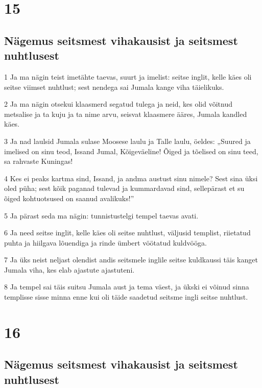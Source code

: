 \chapter{15}

\section*{Nägemus seitsmest vihakausist ja seitsmest nuhtlusest}

\par 1 Ja ma nägin teist imetähte taevas, suurt ja imelist: seitse inglit, kelle käes oli seitse viimset nuhtlust; sest nendega sai Jumala kange viha täielikuks.
\par 2 Ja ma nägin otsekui klaasmerd segatud tulega ja neid, kes olid võitnud metsalise ja ta kuju ja ta nime arvu, seisvat klaasmere ääres, Jumala kandled käes.
\par 3 Ja nad laulsid Jumala sulase Moosese laulu ja Talle laulu, öeldes: „Suured ja imelised on sinu teod, Issand Jumal, Kõigeväeline! Õiged ja tõelised on sinu teed, sa rahvaste Kuningas!
\par 4 Kes ei peaks kartma sind, Issand, ja andma austust sinu nimele? Sest sina üksi oled püha; sest kõik paganad tulevad ja kummardavad sind, sellepärast et su õiged kohtuotsused on saanud avalikuks!”
\par 5 Ja pärast seda ma nägin: tunnistustelgi tempel taevas avati.
\par 6 Ja need seitse inglit, kelle käes oli seitse nuhtlust, väljusid templist, riietatud puhta ja hiilgava lõuendiga ja rinde ümbert vöötatud kuldvööga.
\par 7 Ja üks neist neljast olendist andis seitsmele inglile seitse kuldkaussi täis kanget Jumala viha, kes elab ajastute ajastuteni.
\par 8 Ja tempel sai täis suitsu Jumala aust ja tema väest, ja ükski ei võinud sinna templisse sisse minna enne kui oli täide saadetud seitsme ingli seitse nuhtlust.


\chapter{16}

\section*{Nägemus seitsmest vihakausist ja seitsmest nuhtlusest}


